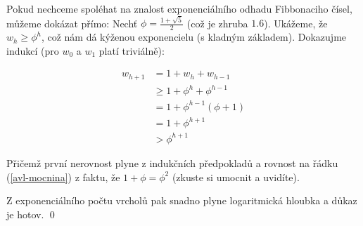 \documentclass{article}
\begin{document}
Pokud nechceme spoléhat na znalost exponenciálního odhadu Fibbonaciho čísel, 
můžeme dokázat přímo: Nechť $\phi=\frac{1+\sqrt{5}}{2}$ (což je zhruba $1.6$).  
Ukážeme, že $w_h \geq \phi^h$, což nám dá kýženou exponencielu (s kladným 
základem).  Dokazujme indukcí (pro $w_0$ a $w_1$ platí triviálně):

\begin{align}
	w_{h+1} &= 1 + w_h + w_{h-1}\\
	&\geq 1 + \phi^h + \phi^{h-1} \\
	&= 1 + \phi^{h-1}(\phi + 1) \\
	\label{avl-mocnina}&= 1 + \phi^{h+1} \\
	&> \phi^{h+1}
\end{align}

Přičemž první nerovnost plyne z indukčních předpokladů a rovnost na řádku 
(\ref{avl-mocnina}) z faktu, že $1+\phi = \phi^2$ (zkuste si umocnit a uvidíte).

Z exponenciálního počtu vrcholů pak snadno plyne logaritmická hloubka a důkaz je 
hotov. \qed
\end{document}
